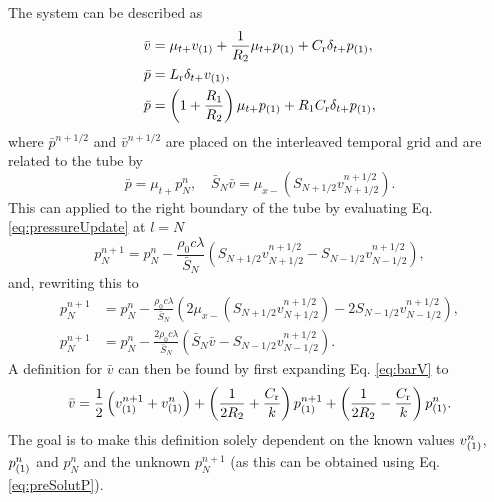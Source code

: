 {The system can be described as
\begin{subequations}\label{eq:barVPSystem}
    \begin{align}
        \bar v &= \mu_{t+}v_{(1)} + \frac{1}{R_2}\mu_{t+}p_{(1)} + C_{\text{r}} \delta_{t+}p_{(1)},\label{eq:barV}\\
        \bar p &= L_{\text{r}} \delta_{t+}v_{(1)},\label{eq:barP1}\\
        \bar p &= \left(1+\frac{R_1}{R_2}\right)\mu_{t+}p_{(1)}+ R_1 C_{\text{r}}\delta_{t+}p_{(1)}\label{eq:barP2},
    \end{align}
\end{subequations}
where $\bar p^{n+1/2}$ and $\bar v^{n+1/2}$ are placed on the interleaved temporal grid and are related to the tube by
\begin{equation}\label{eq:barVars}
    \bar p = \mu_{t+}p^n_N, \quad \bar S_N \bar v = \mu_{x-}\left(S_{N+1/2}v_{N+1/2}^{n+1/2}\right).
\end{equation}
This can applied to the right boundary of the tube by evaluating Eq. \eqref{eq:pressureUpdate} at $l = N$
\begin{equation}
    p_N^{n+1} = p_N^n - \frac{\rho_0 c \lambda}{\bar{S}_N}\left(S_{N+1/2}v_{N+1/2}^{n+1/2}-S_{N-1/2}v_{N-1/2}^{n+1/2}\right),
\end{equation}
and, rewriting this to 
\begin{align}
    p_N^{n+1} &= p_N^n - \frac{\rho_0 c \lambda}{\bar{S}_N}\left(2\mu_{x-}\left(S_{N+1/2}v_{N+1/2}^{n+1/2}\right)-2S_{N-1/2}v_{N-1/2}^{n+1/2}\right)\nonumber,\\
    p_N^{n+1} &= p_N^n - \frac{2\rho_0 c \lambda}{\bar{S}_N}\left(\bar S_N \bar v-S_{N-1/2}v_{N-1/2}^{n+1/2}\right)\label{eq:preSolutP}.
\end{align}
A definition for $\bar v$ can then be found by first expanding Eq. \eqref{eq:barV} to 
\begin{equation}\label{eq:vBarExpanded}
    \bar v = \frac{1}{2}\left(v_{(1)}^{n+1} + v_{(1)}^n\right) + \left(\frac{1}{2R_2} + \frac{C_{\text{r}}}{k}\right) p_{(1)}^{n+1} +\left(\frac{1}{2R_2} - \frac{C_{\text{r}}}{k}\right)p_{(1)}^n.
\end{equation}
The goal is to make this definition solely dependent on the known values $v_{(1)}^n$, $p_{(1)}^n$ and $p_N^n$ and the unknown $p_N^{n+1}$ (as this can be obtained using Eq. \eqref{eq:preSolutP}).

}
